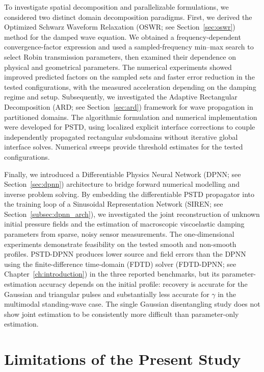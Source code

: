 \documentclass{Configuration_Files/PoliMi3i_thesis}
\newif\ifshowthesischanges
\DeclareRobustCommand{\thesischange}[2]{%
    \ifshowthesischanges
        \textcolor{#1}{#2}%
    \else
        #2%
    \fi
}
\def\thesischange#1#2{#2}%
\begin{document}
To investigate spatial decomposition and parallelizable formulations, we considered two distinct domain decomposition paradigms. First, we derived the Optimized Schwarz Waveform Relaxation (OSWR; see Section~\ref{sec:oswr}) method for the damped wave equation. We obtained a frequency-dependent convergence-factor expression and used a sampled-frequency min--max search to select Robin transmission parameters, then examined their dependence on physical and geometrical parameters. \thesischange{red}{The numerical experiments showed improved predicted factors on the sampled sets and faster error reduction in the tested configurations, with the measured acceleration depending on the damping regime and setup.} Subsequently, we investigated the Adaptive Rectangular Decomposition (ARD; see Section~\ref{sec:ard}) framework for wave propagation in partitioned domains. \thesischange{red}{The algorithmic formulation and numerical implementation were developed for PSTD, using localized explicit interface corrections to couple independently propagated rectangular subdomains without iterative global interface solves. Numerical sweeps provide threshold estimates for the tested configurations.}

Finally, we introduced a Differentiable Physics Neural Network (DPNN; see Section~\ref{sec:dpnn}) architecture to bridge forward numerical modelling and inverse problem solving. By embedding the differentiable PSTD propagator into the training loop of a Sinusoidal Representation Network (SIREN; see Section~\ref{subsec:dpnn_arch}), we investigated the joint reconstruction of unknown initial pressure fields and the estimation of macroscopic viscoelastic damping parameters from sparse, noisy sensor measurements. \thesischange{red}{The one-dimensional experiments demonstrate feasibility on the tested smooth and non-smooth profiles. PSTD-DPNN produces lower source and field errors than the DPNN using the finite-difference time-domain (FDTD) solver (FDTD-DPNN; see Chapter~\ref{ch:introduction}) in the three reported benchmarks, but its parameter-estimation accuracy depends on the initial profile: recovery is accurate for the Gaussian and triangular pulses and substantially less accurate for $\gamma$ in the multimodal standing-wave case. The single Gaussian disentangling study does not show joint estimation to be consistently more difficult than parameter-only estimation.}

\section{\thesischange{red}{Limitations of the Present Study}}
\end{document}
